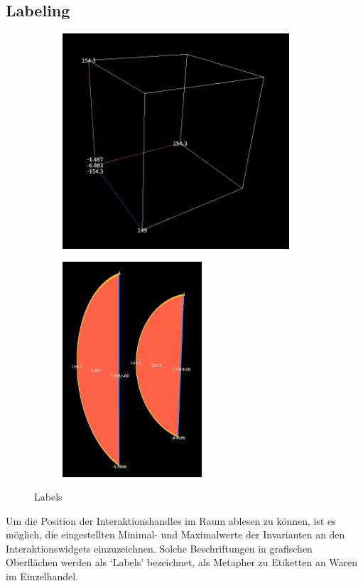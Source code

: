\documentclass[a4paper,fontsize=12pt,toc=bib,halfparskip]{scrartcl}
\begin{document}
\subsection{Labeling}
\begin{figure}
	\centering
	\begin{subfigure}{0.4\textwidth}
		\centering
		\includegraphics[height=8cm]{pictures/QuadricLabels.png}
		\subcaption{}
		\label{QuadricLabels}
	\end{subfigure}
	\hspace{2cm}
	\begin{subfigure}{0.4\textwidth}
		\centering
		\includegraphics[height=8cm]{pictures/CylindricalLabels.png}
		\subcaption{}
		\label{CylindricalLabels}
	\end{subfigure}
	\caption{Labels}
\end{figure}
Um die Position der Interaktionshandles im Raum ablesen zu k\"onnen, ist es m\"oglich, die eingestellten Minimal- und Maximalwerte der Invarianten an den Interaktionswidgets einzuzeichnen. Solche Beschriftungen in grafischen Oberfl\"achen werden als `Labels' bezeichnet, als Metapher zu Etiketten an Waren im Einzelhandel.
\end{document}
